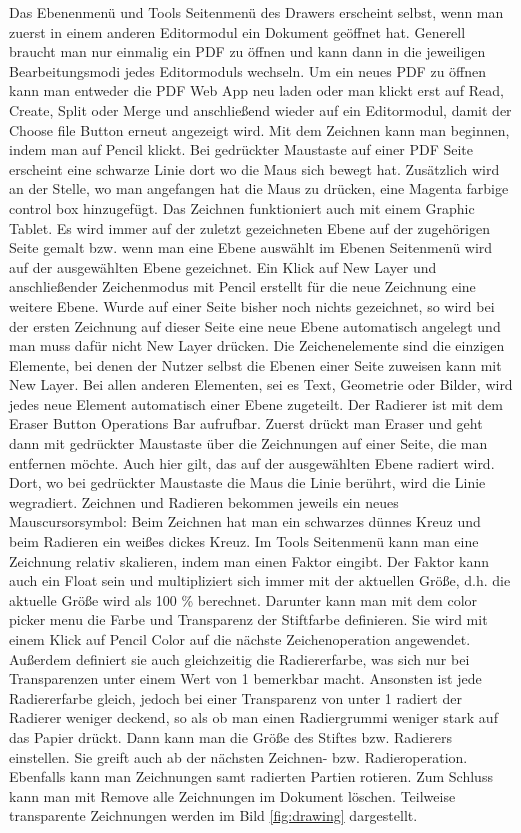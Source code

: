 Das Ebenenmenü und Tools Seitenmenü des Drawers erscheint selbst, wenn man zuerst in einem anderen Editormodul ein Dokument geöffnet hat. Generell braucht man nur einmalig ein PDF zu öffnen und kann dann in die jeweiligen Bearbeitungsmodi jedes Editormoduls wechseln. Um ein neues PDF zu öffnen kann man entweder die PDF Web App neu laden oder man klickt erst auf Read, Create, Split oder Merge und anschließend wieder auf ein Editormodul, damit der Choose file Button erneut angezeigt wird. Mit dem Zeichnen kann man beginnen, indem man auf Pencil klickt. Bei gedrückter Maustaste auf einer PDF Seite erscheint eine schwarze Linie dort wo die Maus sich bewegt hat. Zusätzlich wird an der Stelle, wo man angefangen hat die Maus zu drücken, eine Magenta farbige control box hinzugefügt. Das Zeichnen funktioniert auch mit einem Graphic Tablet. Es wird immer auf der zuletzt gezeichneten Ebene auf der zugehörigen Seite gemalt bzw. wenn man eine Ebene auswählt im Ebenen Seitenmenü wird auf der ausgewählten Ebene gezeichnet. Ein Klick auf New Layer und anschließender Zeichenmodus mit Pencil erstellt für die neue Zeichnung eine weitere Ebene. Wurde auf einer Seite bisher noch nichts gezeichnet, so wird bei der ersten Zeichnung auf dieser Seite eine neue Ebene automatisch angelegt und man muss dafür nicht New Layer drücken. Die Zeichenelemente sind die einzigen Elemente, bei denen der Nutzer selbst die Ebenen einer Seite zuweisen kann mit New Layer. Bei allen anderen Elementen, sei es Text, Geometrie oder Bilder, wird  jedes neue Element automatisch einer Ebene zugeteilt. Der Radierer ist mit dem Eraser Button Operations Bar aufrufbar. Zuerst drückt man Eraser und geht dann mit gedrückter Maustaste über die Zeichnungen auf einer Seite, die man entfernen möchte. Auch hier gilt, das auf der ausgewählten Ebene radiert wird. Dort, wo bei gedrückter Maustaste die Maus die Linie berührt, wird die Linie wegradiert. Zeichnen und Radieren bekommen jeweils ein neues Mauscursorsymbol: Beim Zeichnen hat man ein schwarzes dünnes Kreuz und beim Radieren ein weißes dickes Kreuz. Im Tools Seitenmenü kann man eine Zeichnung relativ skalieren, indem man einen Faktor eingibt. Der Faktor kann auch ein Float sein und multipliziert sich immer mit der aktuellen Größe, d.h. die aktuelle Größe wird als 100 \% berechnet. Darunter kann man mit dem color picker menu die Farbe und Transparenz der Stiftfarbe definieren. Sie wird mit einem Klick auf Pencil Color auf die nächste Zeichenoperation angewendet. Außerdem definiert sie auch gleichzeitig die Radiererfarbe, was sich nur bei Transparenzen unter einem Wert von 1 bemerkbar macht. Ansonsten ist jede Radiererfarbe gleich, jedoch bei einer Transparenz von unter 1 radiert der Radierer weniger deckend, so als ob man einen Radiergrummi weniger stark auf das Papier drückt. Dann kann man die Größe des Stiftes bzw. Radierers einstellen. Sie greift auch ab der nächsten Zeichnen- bzw. Radieroperation. Ebenfalls kann man Zeichnungen samt radierten Partien rotieren. Zum Schluss kann man mit Remove alle Zeichnungen im Dokument löschen. Teilweise transparente Zeichnungen werden im Bild \ref{fig:drawing} dargestellt. 

